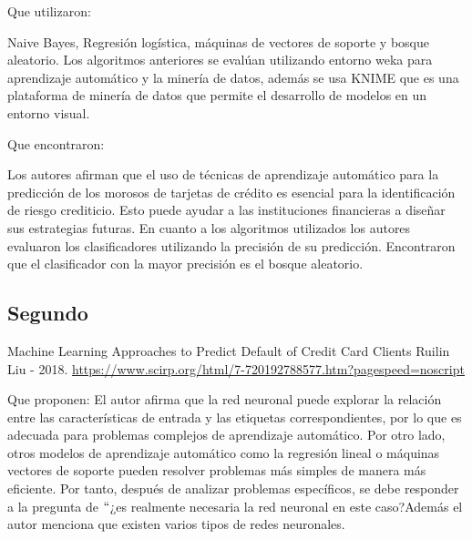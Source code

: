\documentclass[12pt]{report}
\renewcommand{\_}{\kern-1.5pt\textunderscore\kern-1.5pt}
\begin{document}
\vspace{\baselineskip}
Que utilizaron:

\vspace{\baselineskip}
Naive Bayes, Regresión logística, máquinas de vectores de soporte y bosque aleatorio. Los algoritmos anteriores se evalúan utilizando entorno weka para aprendizaje automático y la minería de datos, además se usa KNIME que es una plataforma de minería de datos que permite el desarrollo de modelos en un entorno visual.

\vspace{\baselineskip}
Que encontraron:

\vspace{\baselineskip}
Los autores afirman que el uso de técnicas de aprendizaje automático para la predicción de los morosos de tarjetas de crédito es esencial para la identificación de riesgo crediticio. Esto puede ayudar a las instituciones financieras a diseñar sus estrategias futuras.
En cuanto a los algoritmos utilizados los autores evaluaron los clasificadores utilizando la precisión de su predicción. Encontraron que el clasificador con la mayor precisión es el bosque aleatorio.

\vspace{\baselineskip}

\vspace{\baselineskip}

\vspace{\baselineskip}

\vspace{\baselineskip}

\vspace{\baselineskip}
\subsection{Segundo}
Machine Learning Approaches to Predict Default of Credit Card Clients
{\fontsize{10pt}{12.0pt}\selectfont Ruilin Liu - 2018.}
\href{https://www.scirp.org/html/7-7201927_88577.htm?pagespeed=noscript}{\textcolor[HTML]{1155CC}{\ul{https://www.scirp.org/html/7-7201927\_88577.htm?pagespeed=noscript}}}

\vspace{\baselineskip}
Que proponen: 
El autor afirma que la red neuronal puede explorar la relación entre las características de entrada y las etiquetas correspondientes, por lo que es adecuada para problemas complejos de aprendizaje automático. Por otro lado, otros modelos de aprendizaje automático como la regresión lineal o máquinas vectores de soporte pueden resolver problemas más simples de manera más eficiente. Por tanto, después de analizar problemas específicos, se debe responder a la pregunta de $``$¿es realmente necesaria la red neuronal en este caso?Además el autor menciona que existen varios tipos de redes neuronales.
\end{document}
